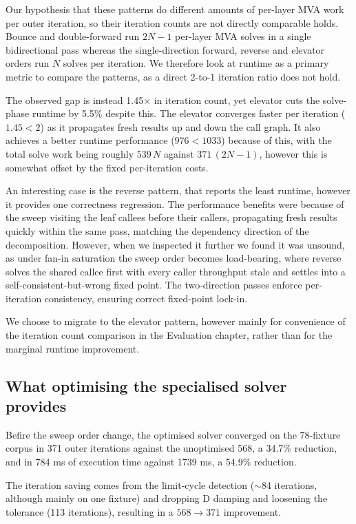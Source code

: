 Our hypothesis that these patterns do different amounts of per-layer MVA work per outer iteration, so their iteration counts are not directly comparable holds. Bounce and double-forward run $2N-1$ per-layer MVA solves in a single bidirectional pass whereas the single-direction forward, reverse and elevator orders run $N$ solves per iteration. We therefore look at runtime as a primary metric to compare the patterns, as a direct 2-to-1 iteration ratio does not hold.

The observed gap is instead 1.45$\times$ in iteration count, yet elevator cuts the solve-phase runtime by 5.5\% despite this. The elevator converges faster per iteration ($1.45 < 2$) as it propagates fresh results up and down the call graph. It also achieves a better runtime performance ($976 < 1033$) because of this, with the total solve work being roughly $539\,N$ against $371\,(2N-1)$, however this is somewhat offset by the fixed per-iteration costs.

An interesting case is the reverse pattern, that reports the least runtime, however it provides one correctness regression. The performance benefits were because of the sweep visiting the leaf callees before their callers, propagating fresh results quickly within the same pass, matching the dependency direction of the decomposition. However, when we inspected it further we found it was unsound, as under fan-in saturation the sweep order becomes load-bearing, where reverse solves the shared callee first with every caller throughput stale and settles into a self-consistent-but-wrong fixed point. The two-direction passes enforce per-iteration consistency, ensuring correct fixed-point lock-in.

We choose to migrate to the elevator pattern, however mainly for convenience of the iteration count comparison in the Evaluation chapter, rather than for the marginal runtime improvement. 



\subsection{What optimising the specialised solver provides}

Befire the sweep order change, the optimised solver converged on the 78-fixture corpus in 371 outer iterations against the unoptimised 568, a 34.7\% reduction, and in 784 ms of execution time against 1739 ms, a 54.9\% reduction. 

The iteration saving comes from the limit-cycle detection ($\sim$84 iterations, although mainly on one fixture) and dropping D damping and loosening the tolerance (113 iterations), resulting in a $568 \rightarrow  371$ improvement. 

